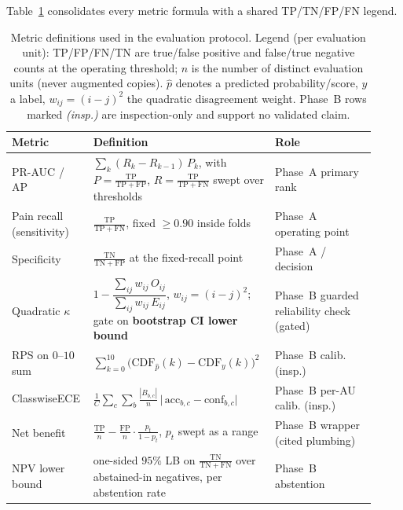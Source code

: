 Table~\ref{tab:metric-defs} consolidates every metric formula with a shared
TP/TN/FP/FN legend.

\begin{table}[t]
\centering
\caption{Metric definitions used in the evaluation protocol. Legend (per evaluation unit):
TP/FP/FN/TN are true/false positive and false/true negative counts at the operating threshold;
$n$ is the number of distinct evaluation units (never augmented copies). $\hat{p}$ denotes a
predicted probability/score, $y$ a label, $w_{ij}=(i-j)^2$ the quadratic disagreement weight.
Phase~B rows marked \emph{(insp.)} are inspection-only and support no validated claim.}
\label{tab:metric-defs}
\small
\begin{tabular}{@{}p{0.215\linewidth}p{0.43\linewidth}p{0.27\linewidth}@{}}
\toprule
\textbf{Metric} & \textbf{Definition} & \textbf{Role} \\
\midrule
PR-AUC / AP &
$\sum_k (R_k - R_{k-1})\,P_k$, with $P=\tfrac{\mathrm{TP}}{\mathrm{TP}+\mathrm{FP}}$,
$R=\tfrac{\mathrm{TP}}{\mathrm{TP}+\mathrm{FN}}$ swept over thresholds &
Phase~A primary rank \\
\addlinespace
Pain recall (sensitivity) &
$\tfrac{\mathrm{TP}}{\mathrm{TP}+\mathrm{FN}}$, fixed $\geq 0.90$ inside folds &
Phase~A operating point \\
\addlinespace
Specificity &
$\tfrac{\mathrm{TN}}{\mathrm{TN}+\mathrm{FP}}$ at the fixed-recall point &
Phase~A / decision \\
\addlinespace
Quadratic $\kappa$ \cite{cohen1968kappa} &
$1 - \dfrac{\sum_{ij} w_{ij}\,O_{ij}}{\sum_{ij} w_{ij}\,E_{ij}}$, $w_{ij}=(i-j)^2$; gate on
\textbf{bootstrap CI lower bound} &
Phase~B guarded reliability check (gated) \\
\addlinespace
RPS on $0\text{--}10$ sum &
$\sum_{k=0}^{10}\big(\mathrm{CDF}_{\hat{p}}(k) - \mathrm{CDF}_{y}(k)\big)^2$ &
Phase~B calib. (insp.) \\
\addlinespace
ClasswiseECE \cite{guo2017calibration} &
$\frac{1}{C}\sum_c \sum_b \tfrac{|B_{b,c}|}{n}\,\big|\,\mathrm{acc}_{b,c}-\mathrm{conf}_{b,c}\big|$ &
Phase~B per-AU calib. (insp.) \\
\addlinespace
Net benefit \cite{vickers2006dca} &
$\tfrac{\mathrm{TP}}{n} - \tfrac{\mathrm{FP}}{n}\cdot\tfrac{p_t}{1-p_t}$, $p_t$ swept as a range &
Phase~B wrapper (cited plumbing) \\
\addlinespace
NPV lower bound \cite{angelopoulos2021ltt} &
one-sided $95\%$ LB on $\tfrac{\mathrm{TN}}{\mathrm{TN}+\mathrm{FN}}$ over abstained-in
negatives, per abstention rate &
Phase~B abstention \\
\bottomrule
\end{tabular}
\end{table}

